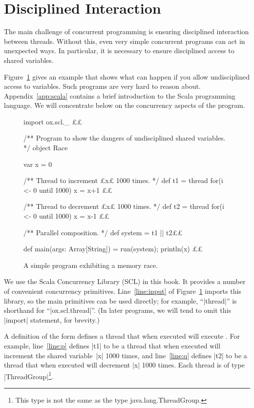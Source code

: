 \section{Disciplined Interaction}

The main challenge of concurrent programming is ensuring disciplined
interaction between threads.  Without this, even very simple concurrent
programs can act in unexpected ways.  In particular, it is necessary to ensure
disciplined access to shared variables.

Figure~\ref{fig:race} gives an example that shows what can happen if you allow
undisciplined access to variables.  Such programs are very hard to reason
about.
Appendix~\ref{app:scala} contains a brief introduction to the Scala
programming language.  We will concentrate below on the concurrency aspects of
the program. 


\begin{figure}
\begin{scala}[numbers = left]
import ox.scl._  £\label{line:input}£

/** Program to show the dangers of undisciplined shared variables. */
object Race{
  var x = 0

  /** Thread to increment £x£ 1000 times. */
  def t1 = thread{ for(i <- 0 until 1000) x = x+1 }£\label{line:p}£

  /** Thread to decrement £x£ 1000 times. */
  def t2 = thread{ for(i <- 0 until 1000) x = x-1 }£\label{line:q}£

  /** Parallel composition. */
  def system = t1 || t2£\label{line:system}£

  def main(args: Array[String]) = { run(system); println(x) }£\label{line:main}£
}
\end{scala}%
\caption{A simple program exhibiting a memory race.}
\label{fig:race}
\end{figure}


We use the Scala Concurrency Library (SCL) in this book.  It provides a number
of convenient concurrency primitives.  Line~\ref{line:input} of
Figure~\ref{fig:race} imports this library, so the main primitives can be used
directly; for example, ``|thread|'' is shorthand for ``|ox.scl.thread|''.  (In
later programs, we will tend to omit this |import| statement, for brevity.)

A definition of the form  defines a thread that when
executed will execute .  For example, line~\ref{line:p} defines
|t1| to be a thread that when executed will increment the shared variable~|x|
1000 times, and line~\ref{line:q} defines |t2| to be a thread that when
executed will decrement |x| 1000 times.  Each thread is of type
|ThreadGroup|\footnote{This type is not the same as the type {\scalashape
    java.lang.ThreadGroup}.}.

